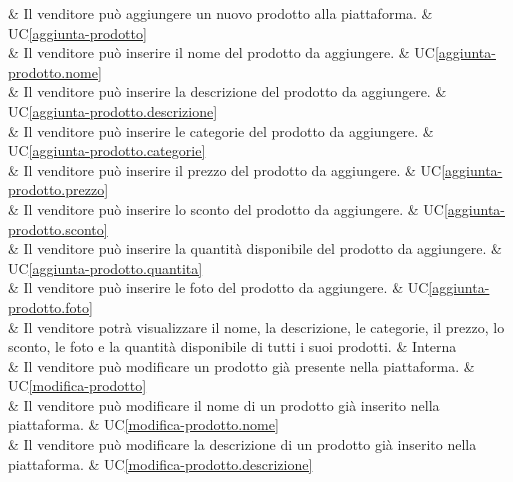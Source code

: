  & Il venditore può aggiungere un nuovo prodotto alla piattaforma. & UC\ref{aggiunta-prodotto} \\
	
 & Il venditore può inserire il nome del prodotto da aggiungere. & UC\ref{aggiunta-prodotto.nome} \\
	
 & Il venditore può inserire la descrizione del prodotto da aggiungere. & UC\ref{aggiunta-prodotto.descrizione} \\
	
 & Il venditore può inserire le categorie del prodotto da aggiungere. & UC\ref{aggiunta-prodotto.categorie} \\
	
 & Il venditore può inserire il prezzo del prodotto da aggiungere. & UC\ref{aggiunta-prodotto.prezzo} \\
	
 & Il venditore può inserire lo sconto del prodotto da aggiungere. & UC\ref{aggiunta-prodotto.sconto} \\
	
 & Il venditore può inserire la quantità disponibile del prodotto da aggiungere. & UC\ref{aggiunta-prodotto.quantita} \\
	
 & Il venditore può inserire le foto del prodotto da aggiungere. & UC\ref{aggiunta-prodotto.foto} \\
	
 & Il venditore potrà visualizzare il nome, la descrizione, le categorie, il prezzo, lo sconto, le foto e la quantità disponibile di tutti i suoi prodotti. & Interna \\
    
 & Il venditore può modificare un prodotto già presente nella piattaforma. & UC\ref{modifica-prodotto} \\
    
 & Il venditore può modificare il nome di un prodotto già inserito nella piattaforma. & UC\ref{modifica-prodotto.nome} \\
    
 & Il venditore può modificare la descrizione di un prodotto già inserito nella piattaforma. & UC\ref{modifica-prodotto.descrizione} \\
    
